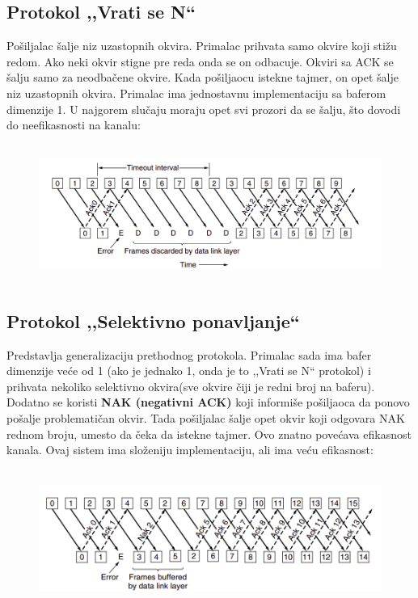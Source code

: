 \documentclass[a4paper]{article}
\begin{document}
    \subsection{Protokol ,,Vrati se N``}
        Pošiljalac šalje niz uzastopnih okvira. Primalac prihvata samo okvire koji stižu redom. 
        Ako neki okvir stigne pre reda onda se on odbacuje. Okviri sa ACK se šalju samo za 
        neodbačene okvire. Kada pošiljaocu istekne tajmer, on opet šalje niz uzastopnih
        okvira. Primalac ima jednostavnu implementaciju sa baferom dimenzije 1. U najgorem slučaju
        moraju opet svi prozori da se šalju, što dovodi do neefikasnosti na kanalu:
        \begin{figure}[H]
            \begin{center}
                \includegraphics[width=120mm,height=45mm]{Slike/prozori3.png}
            \end{center}
        \end{figure}
    \newpage
    \subsection{Protokol ,,Selektivno ponavljanje``}
        Predstavlja generalizaciju prethodnog protokola. Primalac sada ima bafer dimenzije
        veće od 1 (ako je jednako 1, onda je to ,,Vrati se N`` protokol) 
        i prihvata nekoliko selektivno okvira(sve okvire čiji je redni broj na baferu). 
        Dodatno se koristi \textbf{NAK (negativni ACK)} koji informiše pošiljaoca 
        da ponovo pošalje problematičan okvir. Tada pošiljalac šalje opet okvir koji odgovara
        NAK rednom broju, umesto da čeka da istekne tajmer. Ovo znatno povećava
        efikasnost kanala. Ovaj sistem ima složeniju implementaciju, ali ima veću efikasnost:  
        \begin{figure}[H]
            \begin{center}
                \includegraphics[width=120mm,height=45mm]{Slike/prozori4.png}
            \end{center}
        \end{figure} 
    
\end{document}
